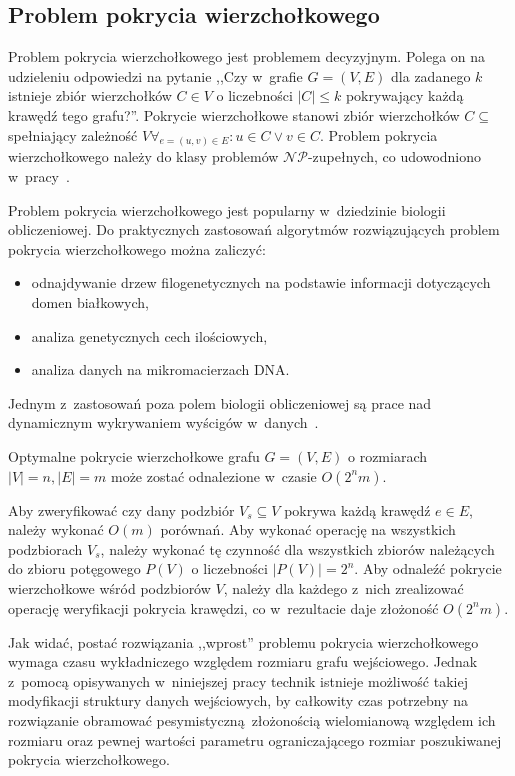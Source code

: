 \subsection{Problem pokrycia wierzchołkowego}\label{s_vertex_cover_domain}
\par{
  Problem pokrycia wierzchołkowego jest problemem decyzyjnym.
  Polega on na udzieleniu odpowiedzi na pytanie ,,Czy w~grafie $G=(V,E)$ dla zadanego $k$
  istnieje zbiór wierzchołków $C \in V$ o liczebności $|C| \leq k$ pokrywający każdą krawędź tego grafu?''.
  Pokrycie wierzchołkowe stanowi zbiór wierzchołków $C \subseteq$ spełniający zależność $V\forall_{e=(u,v) \in E}:u\in C\lor v\in C$.
  Problem pokrycia wierzchołkowego należy do klasy problemów $\mathcal{NP}$-zupełnych, co udowodniono w~pracy~\cite{Kar72}.
}
\par{
  Problem pokrycia wierzchołkowego jest popularny w~dziedzinie biologii obliczeniowej. 
  Do praktycznych zastosowań algorytmów rozwiązujących problem pokrycia wierzchołkowego można zaliczyć:
  \begin{itemize}
    \item odnajdywanie drzew filogenetycznych na podstawie informacji
      dotyczących domen białkowych,
    \item analiza genetycznych cech ilościowych,
    \item analiza danych na mikromacierzach DNA.\@
  \end{itemize}
  Jednym z~zastosowań poza polem biologii obliczeniowej są prace nad dynamicznym wykrywaniem wyścigów w~danych~\cite{O'Callahan:2003:HDD:781498.781528}.
}
\begin{theorem}
  Optymalne pokrycie wierzchołkowe grafu $G=(V,E)$ o rozmiarach $|V|=n, |E|=m$ może zostać odnalezione w~czasie $O(2^{n}m)$.
\end{theorem}
\begin{bproof}
  Aby zweryfikować czy dany podzbiór $V_s \subseteq V$ pokrywa każdą krawędź
  $e \in E$, należy wykonać $O(m)$ porównań.
  Aby wykonać operację na wszystkich podzbiorach $V_s$, należy wykonać tę
  czynność dla wszystkich zbiorów należących do zbioru potęgowego 
  $P(V)$ o liczebności $|P(V)| = 2^{n}$.
  Aby odnaleźć pokrycie wierzchołkowe wśród podzbiorów $V$, należy dla każdego z~nich zrealizować operację weryfikacji pokrycia krawędzi, co w~rezultacie daje 
  złożoność $O(2^{n}m)$.
\end{bproof}
\par{
  Jak widać, postać rozwiązania ,,wprost'' problemu pokrycia wierzchołkowego wymaga czasu wykładniczego względem rozmiaru grafu wejściowego.
  Jednak z~pomocą opisywanych w~niniejszej pracy technik istnieje możliwość takiej modyfikacji struktury danych wejściowych, by całkowity czas potrzebny na rozwiązanie obramować pesymistyczną~złożonością wielomianową względem ich rozmiaru oraz pewnej wartości parametru ograniczającego rozmiar poszukiwanej pokrycia wierzchołkowego.
}
